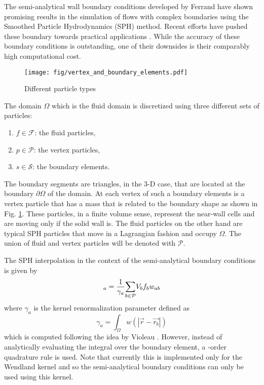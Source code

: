 The semi-analytical wall boundary conditions developed by Ferrand \etal
\cite{ferrand_unified_2012} have shown promising results in the
simulation of flows with complex boundaries using the Smoothed Particle
Hydrodynamics (SPH) method. Recent efforts have pushed these boundary
towards practical applications \cite{mayrhofer_unified_2014, leroy_unified_2014}.
While the accuracy of these boundary conditions is outstanding, one of
their downsides is their comparably high computational cost.
\begin{figure}[htb]
\centering
\texttt{[image: fig/vertex\_and\_boundary\_elements.pdf]}
\caption{Different particle types}
\label{fig:sa:types}
\end{figure}
The domain $\Omega$ which is the fluid domain is discretized using three different sets of particles:
\begin{enumerate}
\item $f \in \mathcal{F}$: the fluid particles,
\item $p \in \mathcal{P}$: the vertex particles,
\item $s \in \mathcal{S}$: the boundary elements.
\end{enumerate}
The boundary segments are triangles, in the 3-D case, that are located at the boundary $\partial \Omega$ of the domain. At each vertex of such a boundary elements is a vertex particle that has a mass that is related to the boundary shape as shown in Fig. \ref{fig:sa:types}. These particles, in a finite volume sense, represent the near-wall cells and are moving only if the solid wall is. The fluid particles on the other hand are typical SPH particles that move in a Lagrangian fashion and occupy $\Omega$. The union of fluid and vertex particles will be denoted with $\mathcal{P}$.

The SPH interpolation in the context of the semi-analytical boundary conditions is given by
\begin{equation}
[f]_a = \frac{1}{\gamma_a}\sumP V_b f_b w_{ab}
\label{e:sa:int}
\end{equation}
where $\gamma_a$ is the kernel renormalization parameter defined as
\begin{equation}
\gamma_a = \int_\Omega w(|\vec{r}-\vec{r_b}|)
\label{e:sa:gam}
\end{equation}
which is computed following the idea by Violeau \etal
\cite{violeau_exact_2014}. However, instead of analytically evaluating
the integral over the boundary element, a -order quadrature rule
is used. Note that currently this is implemented only for the Wendland
kernel and so the semi-analytical boundary conditions can only be used
using this kernel.

